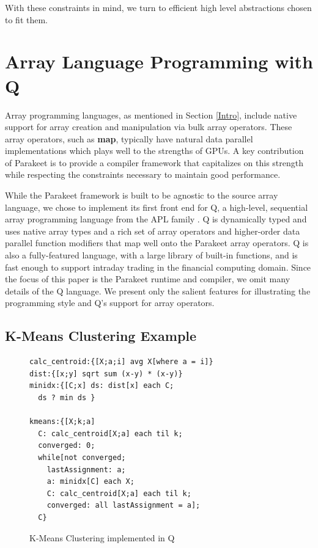 \documentclass[preprint]{sigplanconf}
\begin{document}
With these constraints in mind, we turn to efficient high level abstractions chosen to fit them.

\section{Array Language Programming with Q}
\label{Q}
Array programming languages, as mentioned in Section \ref{Intro}, include native support for array creation and manipulation via bulk array operators. These array operators, such as \textbf{map}, typically have natural data parallel implementations which plays well to the strengths of GPUs.  A key contribution of Parakeet is to provide a compiler framework that capitalizes on this strength while respecting the constraints necessary to maintain good performance.

While the Parakeet framework is built to be agnostic to the source array language, we chose to implement its first front end for Q, a high-level, sequential array programming language from the APL family \cite{Borr08}. Q is dynamically typed and uses native array types and a rich set of array operators and higher-order data parallel function modifiers that map well onto the Parakeet array operators. Q is also a fully-featured language, with a large library of built-in functions, and is fast enough to support
intraday trading in the financial computing domain. Since the focus of this paper is the Parakeet runtime and compiler, we omit many details of the Q language.  We present only the salient features for illustrating the programming style and Q's support for array operators.

\subsection{K-Means Clustering Example}
\begin{figure}[h!]
\begin{lstlisting}
calc_centroid:{[X;a;i] avg X[where a = i]}
dist:{[x;y] sqrt sum (x-y) * (x-y)}
minidx:{[C;x] ds: dist[x] each C; 
  ds ? min ds }

kmeans:{[X;k;a]
  C: calc_centroid[X;a] each til k;
  converged: 0;
  while[not converged;
    lastAssignment: a;
    a: minidx[C] each X;
    C: calc_centroid[X;a] each til k;
    converged: all lastAssignment = a];
  C}
\end{lstlisting}
\caption{K-Means Clustering implemented in Q}
\label{QKMeans}
\end{figure}
\end{document}
